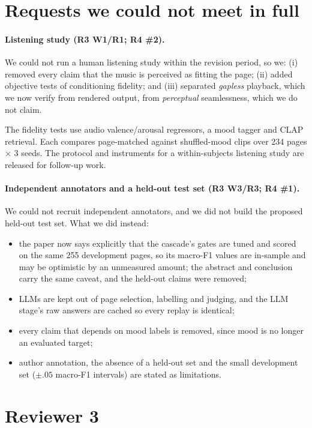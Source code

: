 \documentclass[10pt]{article}
\begin{document}
\section*{Requests we could not meet in full}

\paragraph{Listening study (R3 W1/R1; R4 \#2).}
We could not run a human listening study within the revision period, so we:
(i) removed every claim that the music is perceived as fitting the page;
(ii) added objective tests of conditioning fidelity; and
(iii) separated \emph{gapless} playback, which we now verify from rendered output, from
\emph{perceptual} seamlessness, which we do not claim.

The fidelity tests use audio valence/arousal regressors, a mood tagger and CLAP retrieval.
Each compares page-matched against shuffled-mood clips over 234 pages $\times$ 3 seeds. The
protocol and instruments for a within-subjects listening study are released for follow-up
work.

\paragraph{Independent annotators and a held-out test set (R3 W3/R3; R4 \#1).}
We could not recruit independent annotators, and we did not build the proposed held-out
test set. What we did instead:
\begin{itemize}
\item the paper now says explicitly that the cascade's gates are tuned and scored on the same
  255 development pages, so its macro-F1 values are in-sample and may be optimistic by an
  unmeasured amount; the abstract and conclusion carry the same caveat, and the held-out
  claims were removed;
\item LLMs are kept out of page selection, labelling and judging, and the LLM stage's raw
  answers are cached so every replay is identical;
\item every claim that depends on mood labels is removed, since mood is no longer an
  evaluated target;
\item author annotation, the absence of a held-out set and the small development set
  ($\pm.05$ macro-F1 intervals) are stated as limitations.
\end{itemize}

\section*{Reviewer 3}
\end{document}

